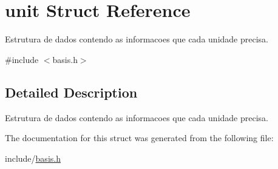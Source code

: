\hypertarget{structunit}{\section{unit \-Struct \-Reference}
\label{structunit}
}


\-Estrutura de dados contendo as informacoes que cada unidade precisa.  




{\ttfamily \#include $<$basis.\-h$>$}



\subsection{\-Detailed \-Description}
\-Estrutura de dados contendo as informacoes que cada unidade precisa. 

\-The documentation for this struct was generated from the following file\-:\begin{DoxyCompactItemize}
\item 
include/\hyperlink{basis_8h}{basis.\-h}\end{DoxyCompactItemize}
